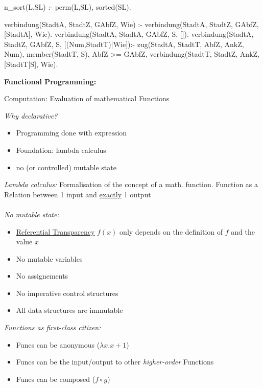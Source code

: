\begin{breakbox}
\begin{prologcode}

n_sort(L,SL) :- perm(L,SL), sorted(SL).


verbindung(StadtA, StadtZ, GAbfZ, Wie) :-
verbindung(StadtA, StadtZ, GAbfZ, [StadtA], Wie).
verbindung(StadtA, StadtA, GAbfZ, S, []).
verbindung(StadtA, StadtZ, GAbfZ, S, [(Num,StadtT)|Wie]):-
zug(StadtA, StadtT, AbfZ, AnkZ, Num),
\+ member(StadtT, S),
AbfZ >= GAbfZ,
verbindung(StadtT, StadtZ, AnkZ, [StadtT|S], Wie).
\end{prologcode}
\end{breakbox}

\begin{breakbox}
\textbf{Functional Programming:}
\begin{mdframed}
  \begin{center}
  	Computation: Evaluation of mathematical Functions
  \end{center}
\end{mdframed}
\emph{Why declarative?}
\begin{itemize}
	\setlength{\itemsep}{0pt}
    \setlength{\parskip}{0pt}
    \setlength{\parsep}{0pt}
    \setlength{\itemindent}{-0.15in}
	\item Programming done with expression
	\item Foundation: lambda calculus
	\item no (or controlled) mutable state
\end{itemize}
\emph{Lambda calculus:} Formalisation of the concept of a math. function. Function as a Relation between 1 input and \underline{exactly} 1 output \\\\
\emph{No mutable state:}
\begin{itemize}
	\setlength{\itemsep}{0pt}
    \setlength{\parskip}{0pt}
    \setlength{\parsep}{0pt}
    \setlength{\itemindent}{-0.15in}
	\item \underline{Referential Transparency} $f(x)$ only depends on the definition of $f$ and the value $x$
	\item No mutable variables
	\item No assignements
	\item No imperative control structures
	\item All data structures are immutable
\end{itemize}
\emph{Functions as first-class citizen:}
\begin{itemize}
	\setlength{\itemsep}{0pt}
    \setlength{\parskip}{0pt}
    \setlength{\parsep}{0pt}
    \setlength{\itemindent}{-0.15in}
	\item Funcs can be anonymous ($\lambda x.x+1$)
	\item Funcs can be the input/output to other \emph{higher-order} Functions
	\item Funcs can be composed ($f \circ g$)
\end{itemize}
\end{breakbox}


